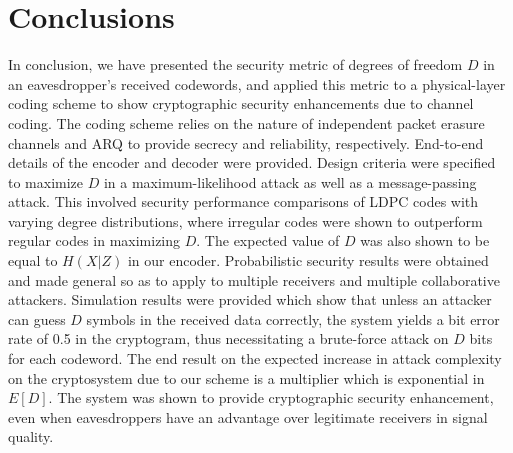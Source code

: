 \documentclass[10pt,twocolumn,twoside]{IEEEtran} \newlength{\pic}
\theoremstyle{definition}
\theoremstyle{remark}
\theoremstyle{plain}
\begin{document}
\section{Conclusions}\label{sec:conclusion}
In conclusion, we have presented the security metric of degrees of freedom $D$ in an eavesdropper's received codewords, and applied this metric to a physical-layer coding scheme to show cryptographic security enhancements due to channel coding. The coding scheme relies on the nature of independent packet erasure channels and ARQ to provide secrecy and reliability, respectively. End-to-end details of the encoder and decoder were provided. Design criteria were specified to maximize $D$ in a maximum-likelihood attack as well as a message-passing attack. This involved security performance comparisons of LDPC codes with varying degree distributions, where irregular codes were shown to outperform regular codes in maximizing $D$. The expected value of $D$ was also shown to be equal to $H(X|Z)$ in our encoder. Probabilistic security results were obtained and made general so as to apply to multiple receivers and multiple collaborative attackers. Simulation results were provided which show that unless an attacker can guess $D$ symbols in the received data correctly, the system yields a bit error rate of 0.5 in the cryptogram, thus necessitating a brute-force attack on $D$ bits for each codeword. The end result on the expected increase in attack complexity on the cryptosystem due to our scheme is a multiplier which is exponential in $E[D]$. The system was shown to provide cryptographic security enhancement, even when eavesdroppers have an advantage over legitimate receivers in signal quality.






\ifCLASSOPTIONpeerreview
\pagebreak
\listoffigures
\listoftables
\fi
\end{document}
